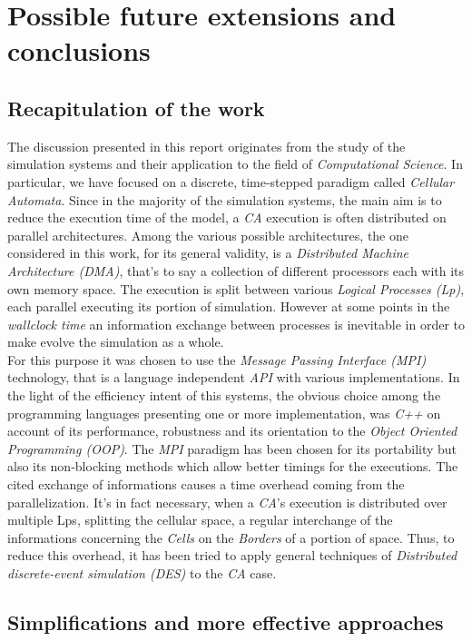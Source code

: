 \documentclass[12pt,a4paper,fleqn]{report}
\begin{document}
\newpage
\chapter{Possible future extensions and conclusions}

\section{Recapitulation of the work}
The discussion presented in this report originates from the study of the simulation systems and their application to the field of \textit{Computational Science}. In particular, we have focused on a discrete, time-stepped paradigm called \textit{Cellular Automata}. Since in the majority of the simulation systems, the main aim is to reduce the execution time of the model, a \textit{CA} execution is often distributed on parallel architectures. Among the various possible architectures, the one considered in this work, for its general validity, is a \textit{Distributed Machine Architecture (DMA)}, that's to say a collection of different processors each with its own memory space. The execution is split between various \textit{Logical Processes (Lp)}, each parallel executing its portion of simulation. However at some points in the \textit{wallclock time} an information exchange between processes is inevitable in order to make evolve the simulation as a whole.\\
 For this purpose it was chosen to use the \textit{Message Passing Interface (MPI)} technology, that is a language independent \textit{API} with various implementations. In the light of the efficiency intent of this systems, the obvious choice among the programming languages presenting one or more implementation, was \textit{C++} on account of its performance, robustness and its orientation to the \textit{Object Oriented Programming (OOP)}. The \textit{MPI} paradigm has been chosen for its portability but also its non-blocking methods which allow better timings for the executions. The cited exchange of informations causes a time overhead coming from the parallelization. It's in fact necessary, when a \textit{CA}'s execution is distributed over multiple Lps, splitting the cellular space, a regular interchange of the informations concerning the \textit{Cells} on the \textit{Borders} of a portion of space. Thus, to reduce this overhead, it has been tried to apply general techniques of \textit{Distributed discrete-event simulation (DES)} to the \textit{CA} case. 
 
 \section{Simplifications and more effective approaches}
 
\end{document}

